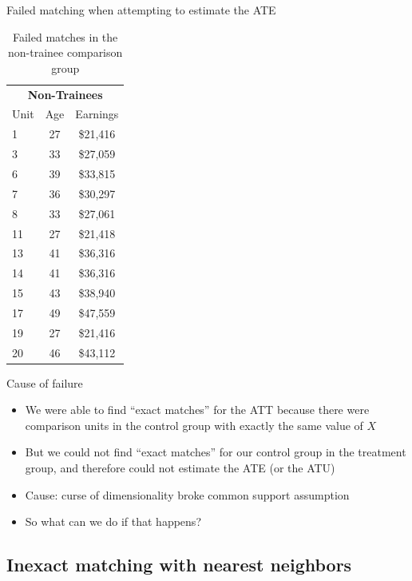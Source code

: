 \documentclass{beamer}
\begin{document}
\begin{frame}{Failed matching when attempting to estimate the ATE}

\begin{table}[htb]\tiny{}
\caption{Failed matches in the non-trainee comparison group}
\centering
\begin{tabular}{lcc}
\toprule
	\multicolumn{3}{c}{\textbf{Non-Trainees}}\\
	\multicolumn{1}{c}{Unit}&
	\multicolumn{1}{c}{Age}&
	\multicolumn{1}{c}{Earnings}\\
\midrule
1&	27&	\$21,416 \\
3&	33&	\$27,059 \\
6&	39&	\$33,815 \\
7&	36&	\$30,297 \\
8&	33&	\$27,061 \\
11&	27&	\$21,418 \\
13&	41&	\$36,316 \\
14&	41&	\$36,316 \\
15&	43&	\$38,940 \\
17&	49&	\$47,559 \\
19&	27&	\$21,416 \\
20&	46&	\$43,112 \\
\bottomrule
\end{tabular}
\label{tab:trainee3}
\end{table}

\end{frame}

\begin{frame}{Cause of failure}

\begin{itemize}

\item We were able to find ``exact matches'' for the ATT because there were comparison units in the control group with exactly the same value of $X$
\item But we could not find ``exact matches'' for our control group in the treatment group, and therefore could not estimate the ATE (or the ATU)
\item Cause: curse of dimensionality broke common support assumption
\item So what can we do if that happens?  

\end{itemize}

\end{frame}


\subsection{Inexact matching with nearest neighbors}
\end{document}
